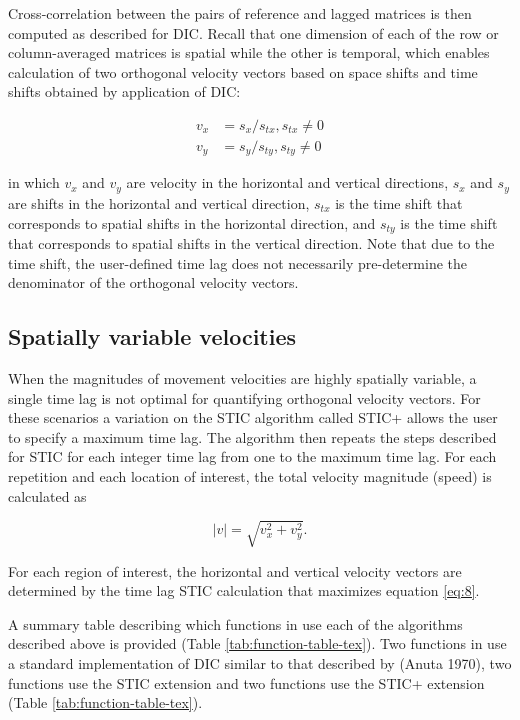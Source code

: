 Cross-correlation between the pairs of reference and lagged matrices is then computed as described for DIC. Recall that one dimension of each of the row or column-averaged matrices is spatial while the other is temporal, which enables calculation of two orthogonal velocity vectors based on space shifts and time shifts obtained by application of DIC:

\begin{eqnarray}
v_x &= s_x/s_{tx}, s_{tx} \neq 0 \label{eq:6}\\
v_y &= s_y/s_{ty}, s_{ty} \neq 0 \label{eq:7}
\end{eqnarray}

\noindent in which \(v_x\) and \(v_y\) are velocity in the horizontal and vertical directions, \(s_x\) and \(s_y\) are shifts in the horizontal and vertical direction, \(s_{tx}\) is the time shift that corresponds to spatial shifts in the horizontal direction, and \(s_{ty}\) is the time shift that corresponds to spatial shifts in the vertical direction. Note that due to the time shift, the user-defined time lag does not necessarily pre-determine the denominator of the orthogonal velocity vectors.

\hypertarget{spatially-variable-velocities}{%
\subsection{Spatially variable velocities}\label{spatially-variable-velocities}}

When the magnitudes of movement velocities are highly spatially variable, a single time lag is not optimal for quantifying orthogonal velocity vectors. For these scenarios a variation on the STIC algorithm called STIC+ allows the user to specify a maximum time lag. The algorithm then repeats the steps described for STIC for each integer time lag from one to the maximum time lag. For each repetition and each location of interest, the total velocity magnitude (speed) is calculated as

\begin{equation}
|v| = \sqrt{v_x^2 + v_y^2}.
\label{eq:8}
\end{equation}

\noindent For each region of interest, the horizontal and vertical velocity vectors are determined by the time lag STIC calculation that maximizes equation \eqref{eq:8}.

A summary table describing which functions in  use each of the algorithms described above is provided (Table \ref{tab:function-table-tex}). Two functions in  use a standard implementation of DIC similar to that described by (Anuta 1970), two functions use the STIC extension and two functions use the STIC+ extension (Table \ref{tab:function-table-tex}).

